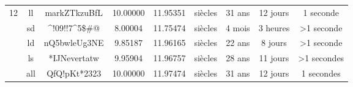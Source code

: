 \begin{table}[H]
{\begin{tabular}{lcccccccc}
			\multirow{5}{*}{12}                               & ll                           & markZTkzuBfL                                     & 10.00000                                                                            & 11.95351                                                                                        & siècles                                                            & 31 ans                                                               & 12 jours                                                             & 1 seconde                                                            \\ \cline{2-9} 
			& sd                           & \textasciicircum{}!09!!7\textasciicircum{}5\$\#@ & 8.00004                                                                             & 11.75474                                                                                        & siècles                                                            & 4 mois                                                               & 3 heures                                                             & \textgreater 1 seconde                                               \\ \cline{2-9} 
			& ld                           & nQ5bwleUg3NE                                     & 9.85187                                                                             & 11.96165                                                                                        & siècles                                                            & 22 ans                                                               & 8 jours                                                              & \textgreater 1 seconde                                               \\ \cline{2-9} 
			& ls                           & *IJNevertatw                                     & 9.95904                                                                             & 11.96757                                                                                        & siècles                                                            & 28 ans                                                               & 11 jours                                                             & \textgreater 1 secondes                                              \\ \cline{2-9} 
			& all                          & QfQ!pKt*2323                                     & 10.00000                                                                            & 11.97474                                                                                        & siècles                                                            & 31 ans                                                               & 12 jours                                                             & 1 secondes                                                           \\ \hline\hline

\end{tabular}}
\end{table}
